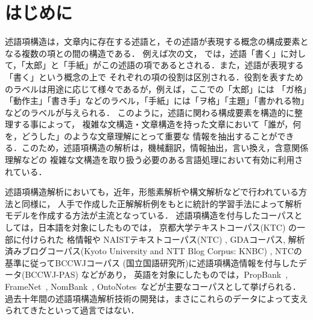 \documentclass[japanese]{jnlp_1.4}
\begin{document}
\maketitle


\section{はじめに}

述語項構造は，文章内に存在する述語と，その述語が表現する概念の構成要素となる複数の項との間の構造である．
例えば次の文，
では，述語「書く」に対して，「太郎」と「手紙」がこの述語の項であるとされる．また，述語が表現する「書く」という概念の上で
それぞれの項の役割は区別される．役割を表すためのラベルは用途に応じて様々であるが，例えば，ここでの「太郎」には
「ガ格」「動作主」「書き手」などのラベル，「手紙」には「ヲ格」「主題」「書かれる物」などのラベルが与えられる．
このように，述語に関わる構成要素を構造的に整理する事によって，
複雑な文構造・文章構造を持った文章において「誰が，何を，どうした」のような文章理解にとって重要な
情報を抽出することができる．このため，述語項構造の解析は，機械翻訳，情報抽出，言い換え，含意関係理解などの
複雑な文構造を取り扱う必要のある言語処理において有効に利用されている\cite{shen2007using,liu2010semantic}．

述語項構造解析においても，近年，形態素解析や構文解析などで行われている方法と同様に，
人手で作成した正解解析例をもとに統計的学習手法によって解析モデルを作成する方法が主流となっている\cite{marquez2008srl}．
述語項構造を付与したコーパスとしては，日本語を対象にしたものでは，
京都大学テキストコーパス(KTC) \cite{KUROHASHISadao:1997-06-24}の一部に付けられた
格情報\cite{kawahara2002construction,河原大輔2002関係}や
NAISTテキストコーパス(NTC) \cite{iida2007annotating,飯田龍2010述語項構造}, GDAコーパス\cite{hashida05}, 
解析済みブログコーパス(Kyoto University and NTT Blog Corpus: KNBC) \cite{橋本力2009}, 
    NTCの基準に従ってBCCWJコーパス (国立国語研究所)\nocite{bccwj}に述語項構造情報を付与したデータ(BCCWJ-PAS) \cite{komachi2011}などがあり，
英語を対象にしたものでは，PropBank~\cite{palmer2005pba}, FrameNet~\cite{Johnson2003}, 
NomBank~\cite{meyers2004nombank}, OntoNotes~\cite{hovy2006ontonotes}などが主要なコーパスとして挙げられる．
過去十年間の述語項構造解析技術の開発は，まさにこれらのデータによって支えられてきたといって過言ではない．
\end{document}
